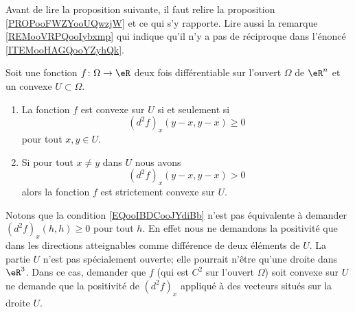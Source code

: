 Avant de lire la proposition suivante, il faut relire la proposition \ref{PROPooFWZYooUQwzjW} et ce qui s'y rapporte. 
Lire aussi la remarque \ref{REMooVRPQooIybxmp} qui indique
qu'il n'y a pas de réciproque dans l'énoncé \ref{ITEMooHAGQooYZyhQk}.     
\begin{proposition}      \label{PROPooBMIRooFkQSAb}
    Soit une fonction \( f\colon \Omega\to \eR\) deux fois différentiable sur l'ouvert \( \Omega\) de \( \eR^n\) et un convexe \( U\subset \Omega\).
    \begin{enumerate}
        \item       \label{ITEMooZQCAooIFjHOn}
            La fonction \( f\) est convexe sur \( U\) si et seulement si
            \begin{equation}        \label{EQooIBDCooJYdiBb}
                (d^2f)_x(y-x,y-x)\geq 0
            \end{equation}
            pour tout \( x,y\in U\).
        \item       \label{ITEMooHAGQooYZyhQk}
            Si pour tout \( x\neq y\) dans \( U\) nous avons
            \begin{equation}
                (d^2f)_x(y-x,y-x)>0
            \end{equation}
            alors la fonction \( f\) est strictement convexe sur \( U\).
    \end{enumerate}
\end{proposition}

\begin{remark}      \label{REMooYCRKooEQNIkC}
    Notons que la condition \eqref{EQooIBDCooJYdiBb} n'est pas équivalente à demander \( (d^2f)_x(h,h)\geq 0\) pour tout \( h\). En effet nous ne demandons la positivité que dans les directions atteignables comme différence de deux éléments de \( U\). La partie \( U\) n'est pas spécialement ouverte; elle pourrait n'être qu'une droite dans \( \eR^3\). Dans ce cas, demander que \( f\) (qui est \( C^2\) sur l'ouvert \( \Omega\)) soit convexe sur \( U\) ne demande que la positivité de \( (d^2f)_x\) appliqué à des vecteurs situés sur la droite \( U\).
\end{remark}

